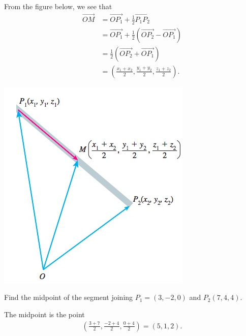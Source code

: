 \documentclass[12pt,letterpaper,reqno]{article}
\numberwithin{equation}{section}
\begin{document}
\begin{pf}
From the figure below, we see that
\begin{align*}
	\overrightarrow{OM}&=\overrightarrow{OP_1}+\frac{1}{2}\overrightarrow{P_1P_2} \\
	&=\overrightarrow{OP_1}+\frac{1}{2}(\overrightarrow{OP_2}-\overrightarrow{OP_1}) \\
	&=\frac{1}{2}(\overrightarrow{OP_2}+\overrightarrow{OP_1}) \\
	&=\left(\frac{x_1+x_2}{2},\frac{y_1+y_2}{2},\frac{z_1+z_2}{2}\right).
\end{align*}
\begin{center}
	\includegraphics[scale=0.5]{figures_mvc/midpoint_formula}
\end{center}	
\end{pf}

\begin{exercise}
Find the midpoint of the segment joining $P_1=(3,-2,0)$ and $P_2(7,4,4)$.	
\end{exercise}

{\color{red} 
The midpoint is the point
\begin{align*}
	\left(\frac{3+7}{2},\frac{-2+4}{2},\frac{0+4}{2}\right)=(5,1,2).
\end{align*}}
\end{document}
